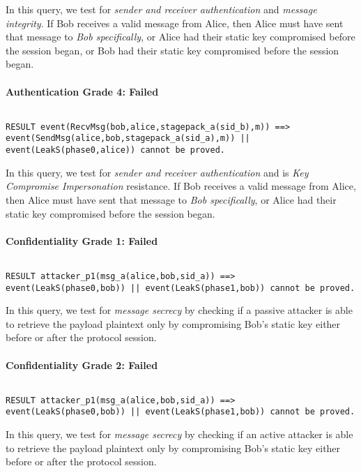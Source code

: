 In this query, we test for \emph{sender and receiver authentication} and \emph{message integrity}. If Bob receives a valid message from Alice, then Alice must have sent that message to \emph{Bob specifically}, or Alice had their static key compromised before the session began, or Bob had their static key compromised before the session began.


\paragraph{Authentication Grade 4: Failed}$ $
\begin{lstlisting}
RESULT event(RecvMsg(bob,alice,stagepack_a(sid_b),m)) ==> event(SendMsg(alice,bob,stagepack_a(sid_a),m)) || event(LeakS(phase0,alice)) cannot be proved.
\end{lstlisting}

In this query, we test for \emph{sender and receiver authentication} and is \emph{Key Compromise Impersonation} resistance. If Bob receives a valid message from Alice, then Alice must have sent that message to \emph{Bob specifically}, or Alice had their static key compromised before the session began.


\paragraph{Confidentiality Grade 1: Failed}$ $
\begin{lstlisting}
RESULT attacker_p1(msg_a(alice,bob,sid_a)) ==> event(LeakS(phase0,bob)) || event(LeakS(phase1,bob)) cannot be proved.
\end{lstlisting}

In this query, we test for \emph{message secrecy} by checking if a passive attacker is able to retrieve the payload plaintext only by compromising Bob's static key either before or after the protocol session.


\paragraph{Confidentiality Grade 2: Failed}$ $
\begin{lstlisting}
RESULT attacker_p1(msg_a(alice,bob,sid_a)) ==> event(LeakS(phase0,bob)) || event(LeakS(phase1,bob)) cannot be proved.
\end{lstlisting}

In this query, we test for \emph{message secrecy} by checking if an active attacker is able to retrieve the payload plaintext only by compromising Bob's static key either before or after the protocol session.


